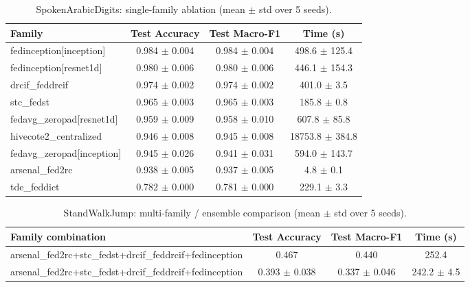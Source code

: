 \begin{table}[t]
\centering
\caption{SpokenArabicDigits: single-family ablation (mean $\pm$ std over 5 seeds).}
\label{tab:results_spokenarabicdigits_ablation}
\begin{tabular}{lccc}
\toprule
Family & Test Accuracy & Test Macro-F1 & Time (s) \\
\midrule
fedinception[inception] & 0.984 $\pm$ 0.004 & 0.984 $\pm$ 0.004 & 498.6 $\pm$ 125.4 \\
fedinception[resnet1d] & 0.980 $\pm$ 0.006 & 0.980 $\pm$ 0.006 & 446.1 $\pm$ 154.3 \\
drcif\_feddrcif & 0.974 $\pm$ 0.002 & 0.974 $\pm$ 0.002 & 401.0 $\pm$ 3.5 \\
stc\_fedst & 0.965 $\pm$ 0.003 & 0.965 $\pm$ 0.003 & 185.8 $\pm$ 0.8 \\
fedavg\_zeropad[resnet1d] & 0.959 $\pm$ 0.009 & 0.958 $\pm$ 0.010 & 607.8 $\pm$ 85.8 \\
hivecote2\_centralized & 0.946 $\pm$ 0.008 & 0.945 $\pm$ 0.008 & 18753.8 $\pm$ 384.8 \\
fedavg\_zeropad[inception] & 0.945 $\pm$ 0.026 & 0.941 $\pm$ 0.031 & 594.0 $\pm$ 143.7 \\
arsenal\_fed2rc & 0.938 $\pm$ 0.005 & 0.937 $\pm$ 0.005 & 4.8 $\pm$ 0.1 \\
tde\_feddict & 0.782 $\pm$ 0.000 & 0.781 $\pm$ 0.000 & 229.1 $\pm$ 3.3 \\
\bottomrule
\end{tabular}
\end{table}

\begin{table}[t]
\centering
\caption{StandWalkJump: multi-family / ensemble comparison (mean $\pm$ std over 5 seeds).}
\label{tab:results_standwalkjump_ensemble}
\begin{tabular}{lccc}
\toprule
Family combination & Test Accuracy & Test Macro-F1 & Time (s) \\
\midrule
arsenal\_fed2rc+stc\_fedst+drcif\_feddrcif+fedinception & 0.467 & 0.440 & 252.4 \\
arsenal\_fed2rc+stc\_fedst+drcif\_feddrcif+fedinception & 0.393 $\pm$ 0.038 & 0.337 $\pm$ 0.046 & 242.2 $\pm$ 4.5 \\
\bottomrule
\end{tabular}
\end{table}

